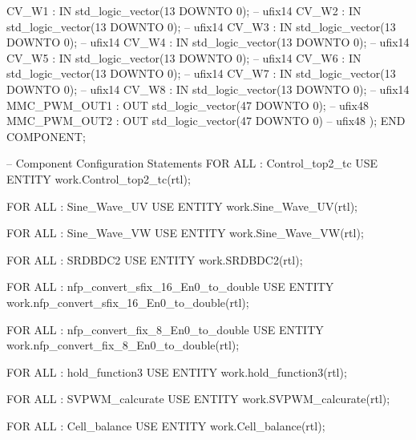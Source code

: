 \begin{mylisting}[language=VHDL,caption=MSSRDCDB制御\&SVPWMモジュール,label=appF_Control_top2_module_VHDL]
          CV_W1                           :   IN    std_logic_vector(13 DOWNTO 0);  -- ufix14
          CV_W2                           :   IN    std_logic_vector(13 DOWNTO 0);  -- ufix14
          CV_W3                           :   IN    std_logic_vector(13 DOWNTO 0);  -- ufix14
          CV_W4                           :   IN    std_logic_vector(13 DOWNTO 0);  -- ufix14
          CV_W5                           :   IN    std_logic_vector(13 DOWNTO 0);  -- ufix14
          CV_W6                           :   IN    std_logic_vector(13 DOWNTO 0);  -- ufix14
          CV_W7                           :   IN    std_logic_vector(13 DOWNTO 0);  -- ufix14
          CV_W8                           :   IN    std_logic_vector(13 DOWNTO 0);  -- ufix14
          MMC_PWM_OUT1                    :   OUT   std_logic_vector(47 DOWNTO 0);  -- ufix48
          MMC_PWM_OUT2                    :   OUT   std_logic_vector(47 DOWNTO 0)  -- ufix48
          );
  END COMPONENT;

  -- Component Configuration Statements
  FOR ALL : Control_top2_tc
    USE ENTITY work.Control_top2_tc(rtl);

  FOR ALL : Sine_Wave_UV
    USE ENTITY work.Sine_Wave_UV(rtl);

  FOR ALL : Sine_Wave_VW
    USE ENTITY work.Sine_Wave_VW(rtl);

  FOR ALL : SRDBDC2
    USE ENTITY work.SRDBDC2(rtl);

  FOR ALL : nfp_convert_sfix_16_En0_to_double
    USE ENTITY work.nfp_convert_sfix_16_En0_to_double(rtl);

  FOR ALL : nfp_convert_fix_8_En0_to_double
    USE ENTITY work.nfp_convert_fix_8_En0_to_double(rtl);

  FOR ALL : hold_function3
    USE ENTITY work.hold_function3(rtl);

  FOR ALL : SVPWM_calcurate
    USE ENTITY work.SVPWM_calcurate(rtl);

  FOR ALL : Cell_balance
    USE ENTITY work.Cell_balance(rtl);


\end{mylisting}
